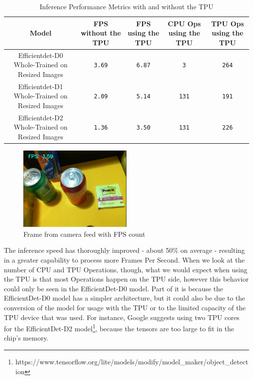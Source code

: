 \documentclass[openright]{normas-utf-tex} %
\begin{document}
\begin{table}[H]
	\centering
	\begin{adjustbox}{width=1\textwidth}
	\label{tab:modelPerformance}
	\begin{tabular}{c|c|c|c|c}
		\hline 
		Model & FPS without the TPU & FPS using the TPU & CPU Ops using the TPU & TPU Ops using the TPU\\
		\hline
        Efficientdet-D0 Whole-Trained on Resized Images & \texttt{3.69} & \texttt{6.87} & \texttt{3} & \texttt{264}\\
		Efficientdet-D1 Whole-Trained on Resized Images & \texttt{2.09} & \texttt{5.14} & \texttt{131} & \texttt{191}\\
		Efficientdet-D2 Whole-Trained on Resized Images & \texttt{1.36} & \texttt{3.50} & \texttt{131} & \texttt{226}\\ 
		\hline 
	\end{tabular}
	\end{adjustbox}
	\caption[Inference Performance Metrics with and without the TPU]{Inference Performance Metrics with and without the TPU}
\end{table}

\begin{figure}[H]
	\centering
	\includegraphics[width=0.5\textwidth]{./images/frameratemeasurement.png}
    \caption[Frame from camera feed with FPS count]{Frame from camera feed with FPS count}
\end{figure}

The inference speed has thoroughly improved - about 50\% on average - resulting
in a greater capability to process more Frames Per Second. When we look at the
number of CPU and TPU Operations, though, what we would expect when using the
TPU is that most Operations happen on the TPU side, however this behavior could
only be seen in the EfficientDet-D0 model. Part of it is because the
EfficientDet-D0 model has a simpler architecture, but it could also be due to
the conversion of the model for usage with the TPU or to the limited capacity
of the TPU device that was used. For instance, Google suggests using two TPU
cores for the EfficientDet-D2
model\footnote{https://www.tensorflow.org/lite/models/modify/model\_maker/object\_detection},
because the tensors are too large to fit in the chip's memory.
\end{document}
